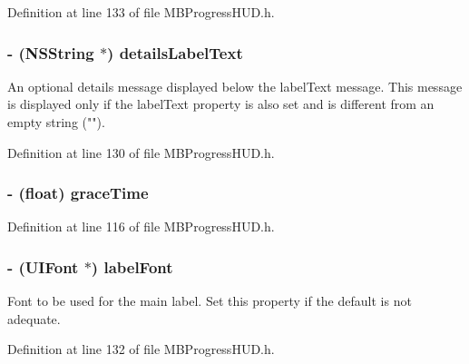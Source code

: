 Definition at line 133 of file MBProgressHUD.h.

\hypertarget{interface_m_b_progress_h_u_d_ae16c349e909c11b26e72501ba1a13154}{
\subsubsection[{detailsLabelText}]{\setlength{\rightskip}{0pt plus 5cm}-\/ (NSString $\ast$) detailsLabelText}}
\label{interface_m_b_progress_h_u_d_ae16c349e909c11b26e72501ba1a13154}
An optional details message displayed below the labelText message. This message is displayed only if the labelText property is also set and is different from an empty string (""). 

Definition at line 130 of file MBProgressHUD.h.

\hypertarget{interface_m_b_progress_h_u_d_ab22f44d31708d989ea3c1fe8452b13d2}{
\subsubsection[{graceTime}]{\setlength{\rightskip}{0pt plus 5cm}-\/ (float) graceTime}}
\label{interface_m_b_progress_h_u_d_ab22f44d31708d989ea3c1fe8452b13d2}


Definition at line 116 of file MBProgressHUD.h.

\hypertarget{interface_m_b_progress_h_u_d_a4cfdebd008893a876603f2b234eb2ccd}{
\subsubsection[{labelFont}]{\setlength{\rightskip}{0pt plus 5cm}-\/ (UIFont $\ast$) labelFont}}
\label{interface_m_b_progress_h_u_d_a4cfdebd008893a876603f2b234eb2ccd}
Font to be used for the main label. Set this property if the default is not adequate. 

Definition at line 132 of file MBProgressHUD.h.

